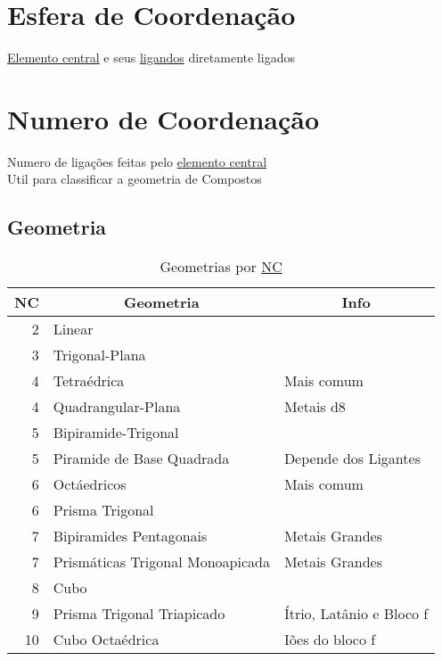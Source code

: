 \documentclass{article}
\begin{document}
\section{Esfera de Coordenação}
\label{esfera de coordenacao}
%
\hyperref[elemento central]{Elemento central} e seus \hyperref[ligando]{ligandos} diretamente ligados
%


\section{Numero de Coordenação}
\label{numero de coordenacao}
%
Numero de ligações feitas pelo \hyperref[elemento central]{elemento central}\\
Util para classificar a geometria de Compostos
%

\subsection{Geometria}

\begin{table}[H]\centering
\begin{tabular}{r l l}

	\multicolumn{1}{c}{NC}
	& \multicolumn{1}{c}{Geometria}
	& \multicolumn{1}{c}{Info}
	
	\\ \toprule
	
	   2 & Linear
	\\ 3 & Trigonal-Plana
	\\ 4 & Tetraédrica & Mais comum
	\\ 4 & Quadrangular-Plana & Metais d8
	\\ 5 & Bipiramide-Trigonal
	\\ 5 & Piramide de Base Quadrada & Depende dos Ligantes
	\\ 6 & Octáedricos & Mais comum
	\\ 6 & Prisma Trigonal &
	\\ 7 & Bipiramides Pentagonais & Metais Grandes
	\\ 7 & Prismáticas Trigonal Monoapicada & Metais Grandes
	\\ 8 & Cubo &
	\\ 9 & Prisma Trigonal Triapicado 
		& Ítrio, Latânio e Bloco f
	\\ 10& Cubo Octaédrica & Iões do bloco f
	
	\\ \bottomrule

\end{tabular}
\caption{Geometrias por \hyperref[numero de coordenacao]{NC}}
\end{table}
\end{document}
